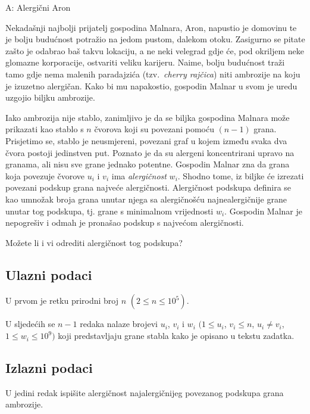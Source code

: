 \begin{statement}[
  timelimit=1 s,
  memorylimit=512 MiB,
]{A: Alergični Aron}

Nekadašnji najbolji prijatelj gospodina Malnara, Aron, napustio je domovinu te
je bolju budućnost potražio na jedom pustom, dalekom otoku. Zasigurno se pitate
zašto je odabrao baš takvu lokaciju, a ne neki velegrad gdje će, pod okriljem
neke glomazne korporacije, ostvariti veliku karijeru. Naime, bolju budućnost
traži tamo gdje nema malenih paradajzića (tzv.\ \textit{cherry rajčica}) niti
ambrozije na koju je izuzetno alergičan. Kako bi mu napakostio, gospodin Malnar
u svom je uredu uzgojio biljku ambrozije.

Iako ambrozija nije stablo, zanimljivo je da se biljka gospodina Malnara može
prikazati kao stablo s $n$ čvorova koji su povezani pomoću $(n-1)$ grana.
Prisjetimo se, stablo je neusmjereni, povezani graf u kojem između svaka dva
čvora postoji jedinstven put. Poznato je da su
alergeni koncentrirani upravo na granama, ali nisu sve grane jednako potentne.
Gospodin Malnar zna da grana koja povezuje čvorove $u_i$ i $v_i$ ima
\textit{alergičnost} $w_i$. Shodno tome, iz biljke će izrezati povezani podskup
grana najveće alergičnosti. Alergičnost podskupa definira se kao umnožak broja
grana unutar njega sa alergičnošću najnealergičnije grane unutar tog podskupa,
tj. grane s minimalnom vrijednosti $w_i$. Gospodin Malnar je nepogrešiv i odmah
je pronašao podskup s najvećom alergičnosti.

Možete li i vi odrediti alergičnost tog podskupa?

\subsection*{Ulazni podaci}
U prvom je retku prirodni broj $n$ $(2 \le n \le 10^5)$.

U sljedećih se $n-1$ redaka nalaze brojevi $u_i$, $v_i$ i $w_i$
$(1 \le u_i$, $v_i \le n$, $u_i \neq v_i$, $1 \le w_i \le 10^9)$ koji
predstavljaju grane stabla kako je opisano u tekstu zadatka.

\subsection*{Izlazni podaci}
U jedini redak ispišite alergičnost najalergičnijeg povezanog podskupa
grana ambrozije.


\end{statement}
